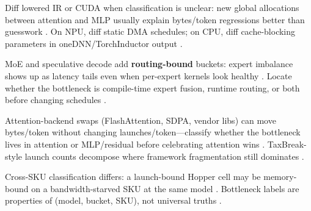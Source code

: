 Diff lowered IR or CUDA when classification is unclear: new global allocations between attention and MLP usually explain bytes/token regressions better than guesswork \citep{yirage2026,chen2020compilerbasedhardw,dao2022flashattention}. On NPU, diff static DMA schedules; on CPU, diff cache-blocking parameters in oneDNN/TorchInductor output \citep{amd2024xdna,amd2024aie,dlbook,chen2020compilerbasedhardw}.

MoE and speculative decode add \textbf{routing-bound} buckets: expert imbalance shows up as latency tails even when per-expert kernels look healthy \citep{liu2024deepseekv3,taxbreak2026,kwon2023vllm}. Locate whether the bottleneck is compile-time expert fusion, runtime routing, or both before changing schedules \citep{yirage2026,chen2020compilerbasedhardw,patel2025llminference,memoryfloor2026,amd2024aie,dlbook,semianalysis2024tma,amd2024xdna,dao2022flashattention,dao2023flashdecoding,nvidia2024cudagraphs,nvidia2022hopper}.

Attention-backend swaps (FlashAttention, SDPA, vendor libs) can move bytes/token without changing launches/token---classify whether the bottleneck lives in attention or MLP/residual before celebrating attention wins \citep{dao2022flashattention,dao2023flashdecoding,kwon2023vllm,taxbreak2026,memoryfloor2026,yirage2026,chen2020compilerbasedhardw,patel2025llminference,amd2024aie,dlbook,semianalysis2024tma,amd2024xdna,liu2024deepseekv3,dao2023flashdecoding,nvidia2024cudagraphs,nvidia2022hopper}. TaxBreak-style launch counts decompose where framework fragmentation still dominates \citep{taxbreak2026,patel2025llminference,kwon2023vllm,yirage2026,chen2020compilerbasedhardw,memoryfloor2026,amd2024aie,dlbook,semianalysis2024tma,amd2024xdna,dao2022flashattention,liu2024deepseekv3,dao2023flashdecoding,nvidia2024cudagraphs,nvidia2022hopper}.

Cross-SKU classification differs: a launch-bound Hopper cell may be memory-bound on a bandwidth-starved SKU at the same model \citep{memoryfloor2026,semianalysis2024tma,patel2025llminference,yirage2026,chen2020compilerbasedhardw,amd2024xdna,amd2024aie,dlbook,kwon2023vllm,liu2024deepseekv3,taxbreak2026,dao2022flashattention,dao2023flashdecoding,nvidia2024cudagraphs,nvidia2022hopper}. Bottleneck labels are properties of (model, bucket, SKU), not universal truths \citep{patel2025llminference,yirage2026,chen2020compilerbasedhardw,memoryfloor2026,taxbreak2026,amd2024aie,dlbook,kwon2023vllm,liu2024deepseekv3,semianalysis2024tma,amd2024xdna,dao2022flashattention,dao2023flashdecoding,nvidia2024cudagraphs,nvidia2022hopper}.

